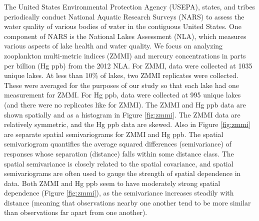 \documentclass[]{elsarticle} %
\begin{document}
The United States Environmental Protection Agency (USEPA), states, and
tribes periodically conduct National Aquatic Research Surveys (NARS) to
assess the water quality of various bodies of water in the contiguous
United States. One component of NARS is the National Lakes Assessment
(NLA), which measures various aspects of lake health and water quality.
We focus on analyzing zooplankton multi-metric indices (ZMMI) and
mercury concentrations in parts per billion (Hg ppb) from the 2012 NLA.
For ZMMI, data were collected at 1035 unique lakes. At less than 10\% of
lakes, two ZMMI replicates were collected. These were averaged for the
purposes of our study so that each lake had one measurement for ZMMI.
For Hg ppb, data were collected at 995 unique lakes (and there were no
replicates like for ZMMI). The ZMMI and Hg ppb data are shown spatially
and as a histogram in Figure \ref{fig:zmmi}. The ZMMI data are
relatively symmetric, and the Hg ppb data are skewed. Also in Figure
\ref{fig:zmmi} are separate spatial semivariograms for ZMMI and Hg ppb.
The spatial semivariogram quantifies the average squared differences
(semivariance) of responses whose separation (distance) falls within
some distance class. The spatial semivariance is closely related to the
spatial covariance, and spatial semivariograms are often used to gauge
the strength of spatial dependence in data. Both ZMMI and Hg ppb seem to
have moderately strong spatial dependence (Figure \ref{fig:zmmi}), as
the semivariance increases steadily with distance (meaning that
observations nearby one another tend to be more similar than
observations far apart from one another).
\end{document}
